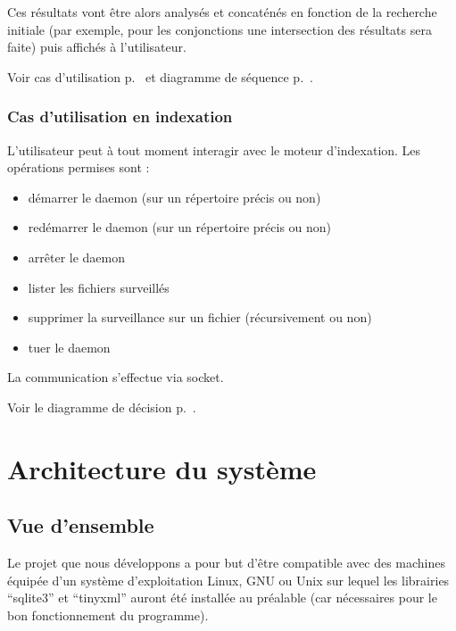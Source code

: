 \documentclass[a4paper,12pt]{report}
\begin{document}
Ces résultats vont être alors analysés et concaténés en fonction de la recherche initiale (par exemple, pour les conjonctions une intersection des résultats sera faite) puis affichés à l'utilisateur.

Voir cas d'utilisation p.~\pageref{utilisation-recherche} et diagramme de séquence p.~\pageref{sequence-recherche}.

\subsection{Cas d'utilisation en indexation}
L'utilisateur peut à tout moment interagir avec le moteur d'indexation. Les opérations permises sont :
\begin{itemize}
\item démarrer le \gls{daemon} (sur un répertoire précis ou non)
\item redémarrer le \gls{daemon} (sur un répertoire précis ou non)
\item arrêter le \gls{daemon}
\item lister les \glspl{fichier} surveillés
\item supprimer la surveillance sur un \gls{fichier} (récursivement ou non)
\item tuer le \gls{daemon}
\end{itemize}

La communication s'effectue via \gls{socket}.

Voir le diagramme de décision p.~\pageref{decision-mi}.

\chapter{Architecture du système}

\section{Vue d'ensemble}
Le projet que nous développons a pour but d'être compatible avec des machines équipée d'un système d'exploitation Linux, GNU ou Unix sur lequel les librairies \enquote{sqlite3} et \enquote{tinyxml} auront été installée au préalable (car nécessaires pour le bon fonctionnement du programme).
\end{document}
